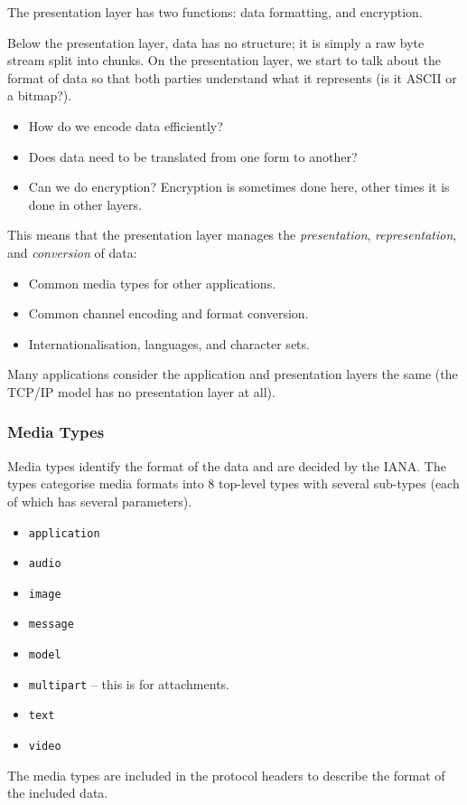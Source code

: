 The presentation layer has two functions: data formatting, and encryption.

Below the presentation layer, data has no structure; it is simply a raw byte stream split into chunks.
On the presentation layer, we start to talk about the format of data so that both parties understand what it represents (is it ASCII or a bitmap?).
\begin{itemize}
	\item How do we encode data efficiently?
	\item Does data need to be translated from one form to another?
	\item Can we do encryption?
	      Encryption is sometimes done here, other times it is done in other layers.
\end{itemize}
This means that the presentation layer manages the \emph{presentation}, \emph{representation}, and \emph{conversion} of data:
\begin{itemize}
	\item Common media types for other applications.
	\item Common channel encoding and format conversion.
	\item Internationalisation, languages, and character sets.
\end{itemize}
Many applications consider the application and presentation layers the same (the TCP/IP model has no presentation layer at all).

\subsubsection{Media Types}\label{ssub:media_types}

Media types identify the format of the data and are decided by the IANA.
The types categorise media formats into \(8\) top-level types with several sub-types (each of which has several parameters).
\begin{itemize}
	\item \texttt{application}
	\item \texttt{audio}
	\item \texttt{image}
	\item \texttt{message}
	\item \texttt{model}
	\item \texttt{multipart} -- this is for attachments.
	\item \texttt{text}
	\item \texttt{video}
\end{itemize}
\begin{note}
	The media types are included in the protocol headers to describe the format of the included data.
\end{note}

